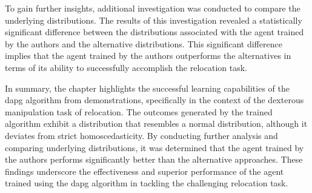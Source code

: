 To gain further insights, additional investigation was conducted to compare the underlying distributions. The results of this investigation revealed a statistically significant difference between the distributions associated with the agent trained by the authors and the alternative distributions. This significant difference implies that the agent trained by the authors outperforms the alternatives in terms of its ability to successfully accomplish the relocation task.\medskip

In summary, the chapter highlights the successful learning capabilities of the \gls{dapg} algorithm from demonstrations, specifically in the context of the dexterous manipulation task of relocation. The outcomes generated by the trained algorithm exhibit a distribution that resembles a normal distribution, although it deviates from strict homoscedasticity. By conducting further analysis and comparing underlying distributions, it was determined that the agent trained by the authors performs significantly better than the alternative approaches. These findings underscore the effectiveness and superior performance of the agent trained using the \gls{dapg} algorithm in tackling the challenging relocation task.